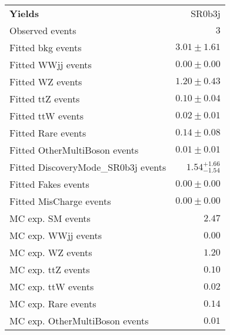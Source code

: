 \begin{table}
\begin{center}
\setlength{\tabcolsep}{0.0pc}
{\small
\begin{tabular*}{\textwidth}{@{\extracolsep{\fill}}lr}
\noalign{\smallskip}\hline\noalign{\smallskip}
{\bf Yields}           & SR0b3j              \\[-0.05cm]
\noalign{\smallskip}\hline\noalign{\smallskip}
Observed events          & $3$                    \\
\noalign{\smallskip}\hline\noalign{\smallskip}
Fitted bkg events         & $3.01 \pm 1.61$              \\
\noalign{\smallskip}\hline\noalign{\smallskip}
        Fitted WWjj events         & $0.00 \pm 0.00$              \\
        Fitted WZ events         & $1.20 \pm 0.43$              \\
        Fitted ttZ events         & $0.10 \pm 0.04$              \\
        Fitted ttW events         & $0.02 \pm 0.01$              \\
        Fitted Rare events         & $0.14 \pm 0.08$              \\
        Fitted OtherMultiBoson events         & $0.01 \pm 0.01$              \\
        Fitted DiscoveryMode\_SR0b3j events         & $1.54_{-1.54}^{+1.66}$              \\
        Fitted Fakes events         & $0.00 \pm 0.00$              \\
        Fitted MisCharge events         & $0.00 \pm 0.00$              \\
 \noalign{\smallskip}\hline\noalign{\smallskip}
MC exp. SM events              & $2.47$              \\
\noalign{\smallskip}\hline\noalign{\smallskip}
        MC exp. WWjj events         & $0.00$              \\
        MC exp. WZ events         & $1.20$              \\
        MC exp. ttZ events         & $0.10$              \\
        MC exp. ttW events         & $0.02$              \\
        MC exp. Rare events         & $0.14$              \\
        MC exp. OtherMultiBoson events         & $0.01$              \\

\end{tabular*}}
\end{center}
\end{table}
